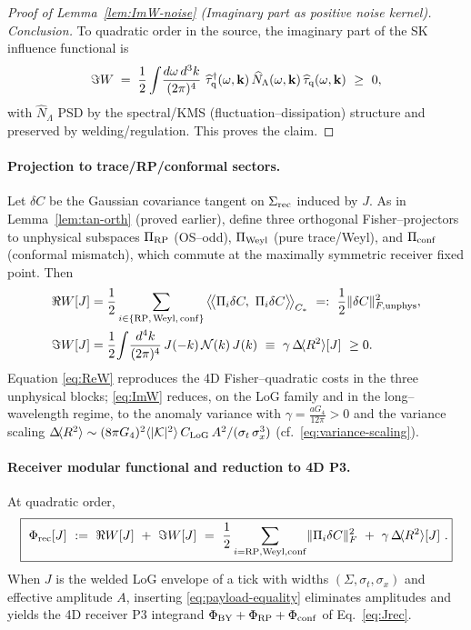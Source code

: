 \documentclass[10pt]{article}
\theoremstyle{definition}
\theoremstyle{plain}
\begin{document}
\begin{proof}[Proof of Lemma~\ref{lem:ImW-noise} (Imaginary part as positive noise kernel)]
\smallskip
\noindent
\emph{Conclusion.}
To quadratic order in the source, the imaginary part of the SK influence functional is
\[
\Im W\;=\;\frac12\int\!\frac{d\omega\,d^3k}{(2\pi)^4}\ \widehat{\tau}_{\rm q}^\dagger(\omega,\mathbf k)\,
\widehat{N}_\Lambda(\omega,\mathbf k)\,\widehat{\tau}_{\rm q}(\omega,\mathbf k)\ \ge\ 0,
\]
with $\widehat{N}_\Lambda$ PSD by the spectral/KMS (fluctuation–dissipation) structure and preserved by welding/regulation. This proves the claim.
\end{proof}


\paragraph{Projection to trace/RP/conformal sectors.}\label{par:uom-main-082}
Let $\delta C$ be the Gaussian covariance tangent on $\Sigma_{\rm rec}$ induced by $J$. 
As in Lemma~\ref{lem:tan-orth} (proved earlier), define three orthogonal Fisher–projectors to unphysical subspaces
$\Pi_{\rm RP}$ (OS–odd), $\Pi_{\rm Weyl}$ (pure trace/Weyl), and $\Pi_{\rm conf}$ (conformal mismatch), which commute at the maximally symmetric receiver fixed point. Then
\begin{align}
\Re W[J]
&=\frac12\sum_{i\in\{\mathrm{RP,\,Weyl,\,conf}\}}
\big\langle\!\big\langle \Pi_i\delta C,\ \Pi_i\delta C\big\rangle\!\big\rangle_{C_\ast}
\ =:\ \frac12\|\delta C\|_{F,\rm unphys}^2,\label{eq:ReW}\\
\Im W[J]
&=\frac12\!\int\!\frac{d^4k}{(2\pi)^4}\,J(-k)\,\mathcal N(k)\,J(k)
\ \equiv\ \gamma\,\Delta\!\langle R^2\rangle[J]\ \ge 0.
\label{eq:ImW}
\end{align}
Equation \eqref{eq:ReW} reproduces the 4D Fisher–quadratic costs in the three unphysical blocks; \eqref{eq:ImW} reduces, on the LoG family and in the long–wavelength regime, to the anomaly variance with
\(
\gamma=\frac{aG_4}{12\pi}>0
\)
and the variance scaling
\(
\Delta\!\langle R^2\rangle \sim (8\pi G_4)^2 \langle |\mathcal K|^2\rangle\, C_{\rm LoG}\,A^2/(\sigma_t\,\sigma_x^3)
\)
(cf.\ \eqref{eq:variance-scaling}).

\paragraph{Receiver modular functional and reduction to 4D P3.}\label{par:uom-main-083}
At quadratic order,
\begin{equation}
\boxed{\
\Phi_{\rm rec}[J]\ :=\ \Re W[J]\ +\ \Im W[J]
\ =\ \frac12\sum_{i=\rm RP,Weyl,conf}\!\|\Pi_i\delta C\|_{F}^2\ +\ \gamma\,\Delta\!\langle R^2\rangle[J]\ .
}
\label{eq:Phi-rec-5D}
\end{equation}
When $J$ is the welded LoG envelope of a tick with widths $(\Sigma,\sigma_t,\sigma_x)$ and effective amplitude $A$, inserting \eqref{eq:payload-equality} eliminates amplitudes and yields the 4D receiver P3 integrand 
$\Phi_{\rm BY}+\Phi_{\rm RP}+\Phi_{\rm conf}$ of Eq.\ \eqref{eq:Jrec}.
\end{document}
